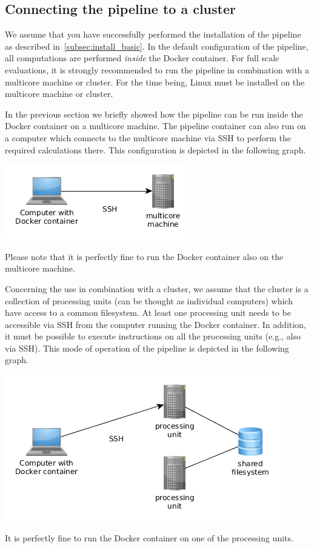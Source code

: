 \documentclass[12pt,a4paper]{scrartcl}
\begin{document}
 \subsection{Connecting the pipeline to a cluster}
 \label{subsec:install_multicore}
 We assume that you have successfully performed the installation of the pipeline as described in~\cref{subsec:install_basic}.
 In the default configuration of the pipeline, all computations are performed \textit{inside} the Docker container.
 For full scale evaluations, it is strongly recommended to run the pipeline in combination with a multicore machine or cluster.
 For the time being, Linux must be installed on the multicore machine or cluster.

 In the previous section we briefly showed how the pipeline can be run inside the Docker container on a multicore machine.
 The pipeline container can also run on a computer which connects to the multicore machine via SSH to perform the
 required calculations there.
 This configuration is depicted in the following graph.
 \begin{center}
 \includegraphics[scale=0.6]{graphs/multicore_config.png}
 \end{center}
 Please note that it is perfectly fine to run the Docker container also on the multicore machine.
 
 Concerning the use in combination with a cluster, we assume that the cluster is a collection of processing units (can be thought as individual computers) which have access to a common filesystem.
 At least one processing unit needs to be accessible via SSH from the computer running the Docker container.
 In addition, it must be possible to execute instructions on all the processing units (e.g., also via SSH). 
 This mode of operation of the pipeline is depicted in the following graph.
 \begin{center}
 \includegraphics[scale=0.6]{graphs/cluster_config.png}
 \end{center}
 It is perfectly fine to run the Docker container on one of the processing units.
 
\end{document}
